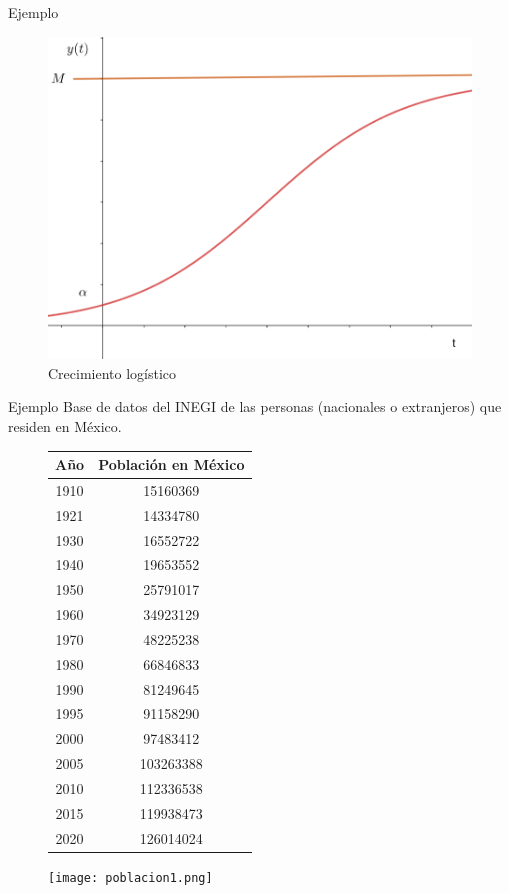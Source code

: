 \documentclass[aspectratio = 169, spanish]{beamer}
\begin{document}
\begin{frame}{Ejemplo}
    \begin{figure}
        \centering
        \includegraphics[width=0.5\linewidth]{eje3.png}
        \caption{Crecimiento logístico}
        \label{fig:ejemplo3}
    \end{figure}
\end{frame}

\begin{frame}{Ejemplo }
Base de datos del INEGI de las personas (nacionales o extranjeros) que residen en México.
    \begin{figure}[htbp]
    \begin{minipage}[c]{0.3\textwidth}
    {\tiny \begin{tabular}{|c|c|}
            \hline Año & Población en México\\
            \hline
            1910 & 15160369\\
            1921 &  14334780\\
            1930 & 16552722\\
            1940 & 19653552\\
            1950 & 25791017\\
            1960 & 34923129\\
            1970 & 48225238\\
            1980 & 66846833\\
            1990 & 81249645\\
            1995 & 91158290\\
            2000 & 97483412\\
            2005 & 103263388\\
            2010 & 112336538\\
            2015 & 119938473\\
            2020 & 126014024 \\ \hline
        \end{tabular}}
        \end{minipage}
        \begin{minipage}[c]{0.65\textwidth}
         \texttt{[image: poblacion1.png]}
        \end{minipage}
    \end{figure}
       
\end{frame}
\end{document}
